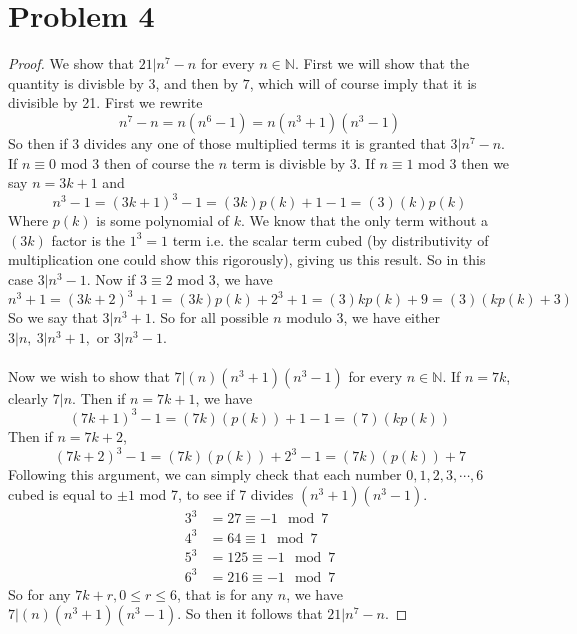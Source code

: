 \documentclass{article}
\theoremstyle{definition}
\begin{document}
\section*{Problem 4}
\begin{proof}
We show that $21 | n^7 - n$ for every $n \in \mathbb{N}$. First we will show that the quantity is divisble by $3$, and then by $7$,
which will of course imply that it is divisible by 21. First we rewrite
\[
    n^7 - n = n(n^6 - 1) = n(n^3 + 1)(n^3 - 1)
\]
So then if 3 divides any one of those multiplied terms it is granted that $3 | n^7 - n$. If $n \equiv 0$ mod 3 then of 
course the $n$ term is divisble by 3. If $n \equiv 1$ mod 3 then we say $n = 3k + 1$ and 
\[
    n^3 - 1 = (3k + 1)^3 - 1 = (3k)p(k) + 1 - 1 = (3)(k)p(k)
\]
Where $p(k)$ is some polynomial of $k$. We know that the only term without a $(3k)$ factor is the $1^3 = 1$ term i.e. the scalar term cubed (by distributivity of multiplication 
one could show this rigorously), giving us this result.
So in this case $3 | n^3 - 1$. Now if $3 \equiv 2$ mod 3, we have 
\[
    n^3 + 1 = (3k + 2)^3 + 1 = (3k)p(k) + 2^3 + 1 = (3)kp(k) + 9 = (3)(kp(k) + 3)
\]
So we say that $3 | n^3 + 1$. So for all possible $n$ modulo 3, we have either $3 | n,\ 3 | n^3 +1,$ or $3 | n^3 -1$.
\\\\
Now we wish to show that $7 | (n)(n^3 + 1)(n^3 - 1)$ for every $n \in \mathbb{N}$. If $n = 7k$,
clearly $7 | n$. Then if $n = 7k + 1$, we have
\[
    (7k+1)^3 - 1 = (7k)(p(k)) + 1 - 1 = (7)(kp(k))
\]
Then if $n = 7k + 2$,
\[
    (7k + 2)^3 - 1 = (7k)(p(k)) + 2^3 - 1 = (7k)(p(k)) + 7
\]
Following this argument, we can simply check that each number $0,1,2,3,\cdots,6$ cubed is equal to $\pm 1$ mod 7,
to see if 7 divides $(n^3 + 1)(n^3 -1)$.
\begin{align*}
    3^3 &= 27 \equiv -1 \mod{7}\\
    4^3 &= 64 \equiv 1 \mod{7}\\
    5^3 &= 125 \equiv -1 \mod{7}\\
    6^3 &= 216 \equiv -1 \mod{7}
\end{align*}
So for any $7k + r, 0 \leqslant r \leqslant 6$, that is for any $n$, we have $7 | (n)(n^3 + 1)(n^3 - 1)$.
So then it follows that $21 | n^7 - n$.
\end{proof}
\end{document}
